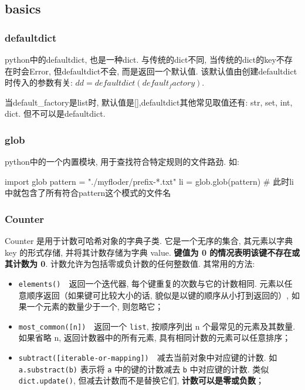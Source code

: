 \subsection{basics}
\subsubsection{defaultdict} python中的defaultdict, 也是一种dict. 与传统的dict不同, 当传统的dict的key不存在时会Error, 但defaultdict不会, 而是返回一个默认值. 该默认值由创建defaultdict时传入的参数有关: $dd = defaultdict(default_factory)$. 

当default\_factory是list时, 默认值是[],defaultdict其他常见取值还有: str, set, int, dict. 但不可以是defaultdict. 

\subsubsection{glob} python中的一个内置模块, 用于查找符合特定规则的文件路劲. 如: 
\begin{python}
	import glob
	pattern = "./myfloder/prefix-*.txt"
	li = glob.glob(pattern) # 此时li中就包含了所有符合pattern这个模式的文件名
\end{python}

\subsubsection{Counter}
Counter 是用于计数可哈希对象的字典子类. 它是一个无序的集合, 其元素以字典 key 的形式存储, 并将其计数存储为字典 value. \textbf{键值为 0 的情况表明该键不存在或其计数为 0}. 计数允许为包括零或负计数的任何整数值. 其常用的方法: 
\begin{itemize}
	\item \texttt{elements()}\ \ 返回一个迭代器, 每个键重复的次数与它的计数相同. 元素以任意顺序返回（如果键可比较大小的话, 貌似是以键的顺序从小打到返回的）, 如果一个元素的数量少于一个, 则忽略它；
	
	\item \texttt{most_common([n])}\ \ 返回一个 \texttt{list}, 按顺序列出 n 个最常见的元素及其数量.  如果省略 n, 返回计数器中的所有元素, 具有相同计数的元素可以任意排序；
	
	\item \texttt{subtract([iterable-or-mapping])}\ \ 减去当前对象中对应键的计数. 如 \texttt{a.substract(b)} 表示将 \texttt{a} 中的键的计数减去 \texttt{b} 中对应键的计数. 类似 \texttt{dict.update()}, 但减去计数而不是替换它们, \textbf{计数可以是零或负数}；
\end{itemize}

